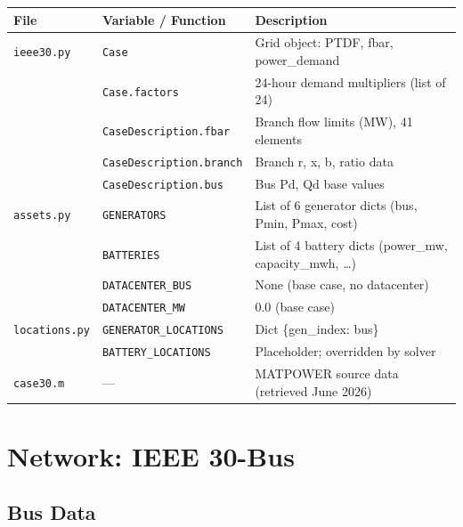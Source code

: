 \documentclass[11pt,a4paper]{article}
\begin{document}
\begin{tabular}{@{}lll@{}}
\toprule
File & Variable / Function & Description \\
\midrule
\texttt{ieee30.py} & \texttt{Case} & Grid object: PTDF, fbar, power\_demand \\
 & \texttt{Case.factors} & 24-hour demand multipliers (list of 24) \\
 & \texttt{CaseDescription.fbar} & Branch flow limits (MW), 41 elements \\
 & \texttt{CaseDescription.branch} & Branch r, x, b, ratio data \\
 & \texttt{CaseDescription.bus} & Bus Pd, Qd base values \\
\texttt{assets.py} & \texttt{GENERATORS} & List of 6 generator dicts (bus, Pmin, Pmax, cost) \\
 & \texttt{BATTERIES} & List of 4 battery dicts (power\_mw, capacity\_mwh, \ldots) \\
 & \texttt{DATACENTER\_BUS} & None (base case, no datacenter) \\
 & \texttt{DATACENTER\_MW} & 0.0 (base case) \\
\texttt{locations.py} & \texttt{GENERATOR\_LOCATIONS} & Dict \{gen\_index: bus\} \\
 & \texttt{BATTERY\_LOCATIONS} & Placeholder; overridden by solver \\
\texttt{case30.m} & --- & MATPOWER source data (retrieved June 2026) \\
\bottomrule
\end{tabular}

\section{Network: IEEE 30-Bus}

\subsection{Bus Data}
\end{document}
